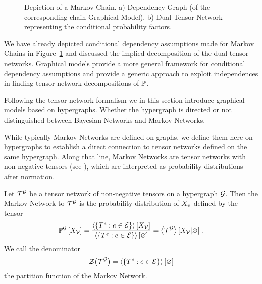 \begin{figure}[h]
\begin{center}
	
\end{center}
\caption{Depiction of a Markov Chain. 
	a) Dependency Graph (of the corresponding chain Graphical Model).
	b) Dual Tensor Network representing the conditional probability factors.}
\label{fig:MC}
\end{figure}








We have already depicted conditional dependency assumptions made for Markov Chains in Figure~\ref{fig:MC} and discussed the implied decomposition of the dual tensor networks.
Graphical models provide a more general framework for conditional dependency assumptions and provide a generic approach to exploit independences in finding tensor network decompositions of $\mathbb{P}$.


Following the tensor network formalism we in this section introduce graphical models based on hypergraphs.
Whether the hypergraph is directed or not distinguished between Bayesian Networks and Markov Networks.








While typically Markov Networks are defined on graphs, we define them here on hypergraphs to establish a direct connection to tensor networks defined on the same hypergraph.
Along that line, Markov Networks are tensor networks with non-negative tensors (see ), which are interpreted as probability distributions after normation.

\begin{definition}\label{def:markovNetwork}
	Let $\mathcal{T}^{\mathcal{G}}$ be a tensor network of non-negative tensors on a hypergraph $\mathcal{G}$.
	Then the Markov Network to $\mathcal{T}^{\mathcal{G}}$ is the probability distribution of $X_{v}$ defined by the tensor
		\[ \mathbb{P}^{\mathcal{G}}\left[X_{\mathcal{V}}\right] = \frac{
			\left\langle \{T^{e} : e \in \mathcal{E}\}\right\rangle \left[ X_{\mathcal{V}} \right] 
		}{
			\left\langle \{T^{e} : e \in \mathcal{E}\}\right\rangle \left[ \varnothing \right]
		} = \left\langle \mathcal{T}^{\mathcal{G}}\right\rangle \left[ X_{\mathcal{V}} | \varnothing \right] \, . \] 
	We call the denominator
		\[\mathcal{Z}{\left(\mathcal{T}^{\mathcal{G}}\right)} = \left\langle \{T^{e} : e \in \mathcal{E}\}\right\rangle \left[ \varnothing \right] \]
	the partition function of the Markov Network.
\end{definition}

